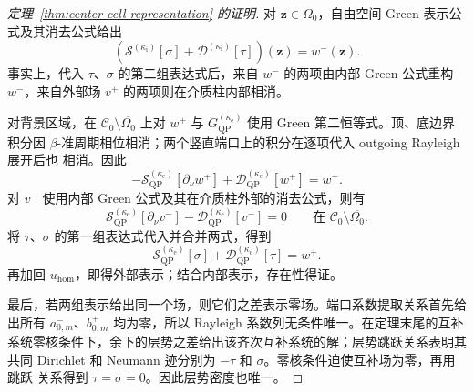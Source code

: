 \begin{proof}[定理~\ref{thm:center-cell-representation} 的证明]
  对 $\mathbf z\in\Omega_0$，自由空间 Green 表示公式及其消去公式给出
  \begin{equation*}
    \left(
      \mathcal S^{(\kappa_{\mathrm i})}[\sigma]
      +\mathcal D^{(\kappa_{\mathrm i})}[\tau]
    \right)(\mathbf z)=w^-(\mathbf z).
  \end{equation*}
  事实上，代入 $\tau$、$\sigma$ 的第二组表达式后，来自 $w^-$ 的两项由内部 Green
  公式重构 $w^-$，来自外部场 $v^+$ 的两项则在介质柱内部相消。

  对背景区域，在 $\mathcal C_0\setminus\overline{\Omega_0}$ 上对 $w^+$ 与
  $G_{\mathrm{QP}}^{(\kappa_{\mathrm e})}$ 使用 Green 第二恒等式。顶、底边界积分因
  $\beta$-准周期相位相消；两个竖直端口上的积分在逐项代入 outgoing Rayleigh 展开后也
  相消。因此
  \begin{equation*}
    -\mathcal S_{\mathrm{QP}}^{(\kappa_{\mathrm e})}
      [\partial_\nu w^+]
    +\mathcal D_{\mathrm{QP}}^{(\kappa_{\mathrm e})}[w^+]
    =w^+.
  \end{equation*}
  对 $v^-$ 使用内部 Green 公式及其在介质柱外部的消去公式，则有
  \begin{equation*}
    \mathcal S_{\mathrm{QP}}^{(\kappa_{\mathrm e})}
      [\partial_\nu v^-]
    -\mathcal D_{\mathrm{QP}}^{(\kappa_{\mathrm e})}[v^-]
    =0
    \qquad\text{在 }\mathcal C_0\setminus\overline{\Omega_0}.
  \end{equation*}
  将 $\tau$、$\sigma$ 的第一组表达式代入并合并两式，得到
  \begin{equation*}
    \mathcal S_{\mathrm{QP}}^{(\kappa_{\mathrm e})}[\sigma]
    +\mathcal D_{\mathrm{QP}}^{(\kappa_{\mathrm e})}[\tau]
    =w^+.
  \end{equation*}
  再加回 $u_{\mathrm{hom}}$，即得外部表示；结合内部表示，存在性得证。

  最后，若两组表示给出同一个场，则它们之差表示零场。端口系数提取关系首先给出所有
  $a_{0,m}^-$、$b_{0,m}^+$ 均为零，所以 Rayleigh 系数列无条件唯一。在定理末尾的互补
  系统零核条件下，余下的层势之差给出该齐次互补系统的解；层势跳跃关系表明其共同
  Dirichlet 和 Neumann 迹分别为 $-\tau$ 和 $\sigma$。零核条件迫使互补场为零，再用跳跃
  关系得到 $\tau=\sigma=0$。因此层势密度也唯一。
\end{proof}
